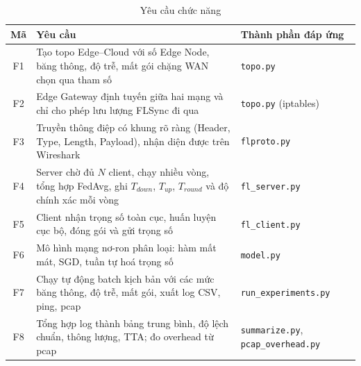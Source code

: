 \begin{table}[H]
    \centering
    \caption{Yêu cầu chức năng}
    \label{tab:req-func}
    \begin{tabularx}{\textwidth}{c >{\raggedright\arraybackslash}X >{\raggedright\arraybackslash}p{4.6cm}}
        \toprule
        \textbf{Mã} & \textbf{Yêu cầu} & \textbf{Thành phần đáp ứng} \\
        \midrule
        F1 & Tạo topo Edge--Cloud với số Edge Node, băng thông, độ trễ, mất gói chặng WAN chọn qua tham số & \texttt{topo.py} \\
        F2 & Edge Gateway định tuyến giữa hai mạng và chỉ cho phép lưu lượng FLSync đi qua & \texttt{topo.py} (iptables) \\
        F3 & Truyền thông điệp có khung rõ ràng (Header, Type, Length, Payload), nhận diện được trên Wireshark & \texttt{flproto.py} \\
        F4 & Server chờ đủ $N$ client, chạy nhiều vòng, tổng hợp FedAvg, ghi $T_{down}$, $T_{up}$, $T_{round}$ và độ chính xác mỗi vòng & \texttt{fl\_server.py} \\
        F5 & Client nhận trọng số toàn cục, huấn luyện cục bộ, đóng gói và gửi trọng số & \texttt{fl\_client.py} \\
        F6 & Mô hình mạng nơ-ron phân loại: hàm mất mát, SGD, tuần tự hoá trọng số & \texttt{model.py} \\
        F7 & Chạy tự động batch kịch bản với các mức băng thông, độ trễ, mất gói, xuất log CSV, ping, pcap & \texttt{run\_experiments.py} \\
        F8 & Tổng hợp log thành bảng trung bình, độ lệch chuẩn, thông lượng, TTA; đo overhead từ pcap & \texttt{summarize.py}, \texttt{pcap\_overhead.py} \\
        \bottomrule
    \end{tabularx}
\end{table}

